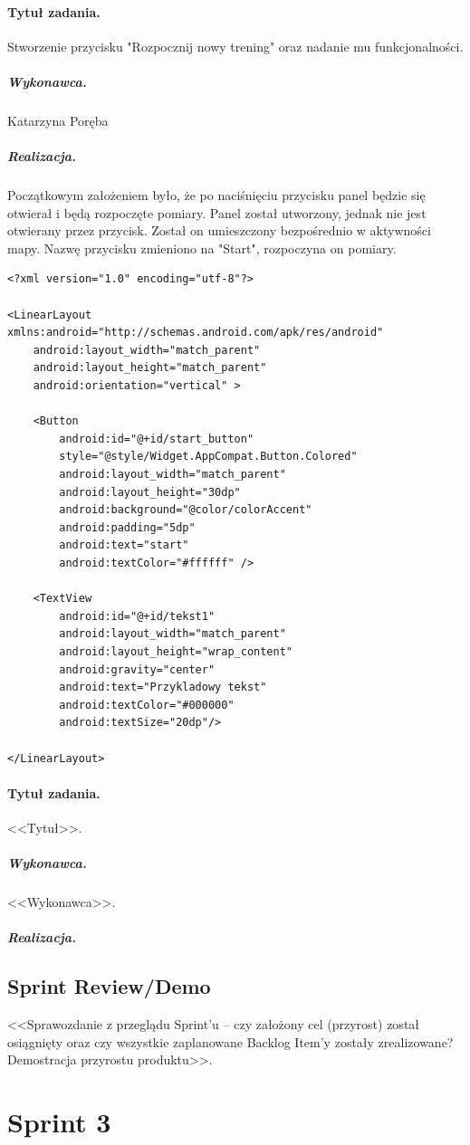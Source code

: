 \documentclass[a4paper]{article}
\begin{document}
\paragraph{Tytuł zadania.} Stworzenie przycisku "Rozpocznij nowy trening" oraz nadanie mu funkcjonalności.
\subparagraph{Wykonawca.} Katarzyna Poręba
\subparagraph{Realizacja.} Początkowym założeniem było, że po naciśnięciu przycisku panel będzie się otwierał i będą rozpoczęte pomiary. Panel został utworzony, jednak nie jest otwierany przez przycisk. Został on umieszczony bezpośrednio w aktywności mapy. Nazwę przycisku zmieniono na "Start", rozpoczyna on pomiary.
\begin{lstlisting}[style=xml]
<?xml version="1.0" encoding="utf-8"?>

<LinearLayout xmlns:android="http://schemas.android.com/apk/res/android"
    android:layout_width="match_parent"
    android:layout_height="match_parent"
    android:orientation="vertical" >

    <Button
        android:id="@+id/start_button"
        style="@style/Widget.AppCompat.Button.Colored"
        android:layout_width="match_parent"
        android:layout_height="30dp"
        android:background="@color/colorAccent"
        android:padding="5dp"
        android:text="start"
        android:textColor="#ffffff" />

    <TextView
        android:id="@+id/tekst1"
        android:layout_width="match_parent"
        android:layout_height="wrap_content"
        android:gravity="center"
        android:text="Przykladowy tekst"
        android:textColor="#000000"
        android:textSize="20dp"/>

</LinearLayout>
\end{lstlisting}

\paragraph{Tytuł zadania.} <<Tytuł>>.
\subparagraph{Wykonawca.} <<Wykonawca>>.
\subparagraph{Realizacja.}

\subsection{Sprint Review/Demo}
<<Sprawozdanie z przeglądu Sprint'u -- czy założony cel (przyrost) został osiągnięty oraz czy wszystkie zaplanowane Backlog Item'y zostały zrealizowane? Demostracja przyrostu produktu>>.

\section{Sprint 3}
\end{document}
